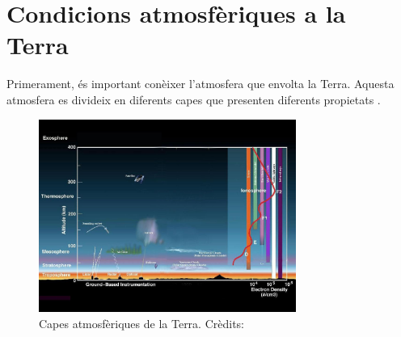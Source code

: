 

\section{Condicions atmosfèriques a la Terra} \label{sec:cond_atmos_terra}

Primerament, és important conèixer l'atmosfera que envolta la Terra. Aquesta atmosfera es divideix en diferents capes que presenten diferents propietats \cite{nasa_atmosfera}.

\begin{figure}[h]
    \centering
    \includegraphics[width=0.75\textwidth]{imagenes/00_general/capes_atmosferiques.jpg}
    \caption{Capes atmosfèriques de la Terra. Crèdits: \cite{nasa_atmosfera}}
    \label{fig:capes_atmosferiques}
\end{figure}

